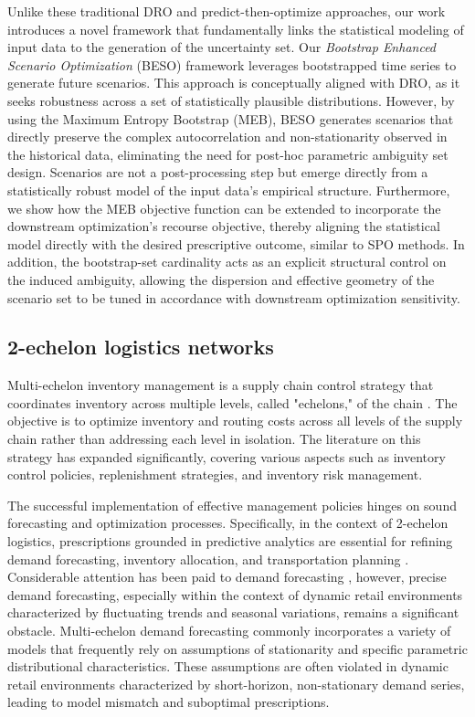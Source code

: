 \documentclass[a4paper,fleqn,3p,11pt,authoryear]{cas-sc}
\begin{document}
Unlike these traditional DRO and predict-then-optimize approaches, our work introduces a novel framework that fundamentally links the statistical modeling of input data to the generation of the uncertainty set. Our {\it Bootstrap Enhanced Scenario Optimization} (BESO) framework leverages bootstrapped time series to generate future scenarios. This approach is conceptually aligned with DRO, as it seeks robustness across a set of statistically plausible distributions. However, by using the Maximum Entropy Bootstrap (MEB), BESO generates scenarios that directly preserve the complex autocorrelation and non-stationarity observed in the historical data, eliminating the need for post-hoc parametric ambiguity set design. Scenarios are not a post-processing step but emerge directly from a statistically robust model of the input data's empirical structure. Furthermore, we show how the MEB objective function can be extended to incorporate the downstream optimization's recourse objective, thereby aligning the statistical model directly with the desired prescriptive outcome, similar to SPO methods. In addition, the bootstrap-set cardinality acts as an explicit structural control on the induced ambiguity, allowing the dispersion and effective geometry of the scenario set to be tuned in accordance with downstream optimization sensitivity.

\subsection{2-echelon logistics networks}

Multi-echelon inventory management is a supply chain control strategy that coordinates inventory across multiple levels, called "echelons," of the chain \citep{Clark60}. The objective is to optimize inventory and routing costs across all levels of the supply chain rather than addressing each level in isolation. The literature on this strategy has expanded significantly, covering various aspects such as inventory control policies, replenishment strategies, and inventory risk management.

The successful implementation of effective management policies hinges on sound forecasting and optimization processes. Specifically, in the context of 2-echelon logistics, prescriptions grounded in predictive analytics are essential for refining demand forecasting, inventory allocation, and transportation planning \citep{A01,KK10}. Considerable attention has been paid to demand forecasting \citep{Ma15,Shenstone01}, however, precise demand forecasting, especially within the context of dynamic retail environments characterized by fluctuating trends and seasonal variations, remains a significant obstacle. Multi-echelon demand forecasting commonly incorporates a variety of models that frequently rely on assumptions of stationarity and specific parametric distributional characteristics. These assumptions are often violated in dynamic retail environments characterized by short-horizon, non-stationary demand series, leading to model mismatch and suboptimal prescriptions.
\end{document}

